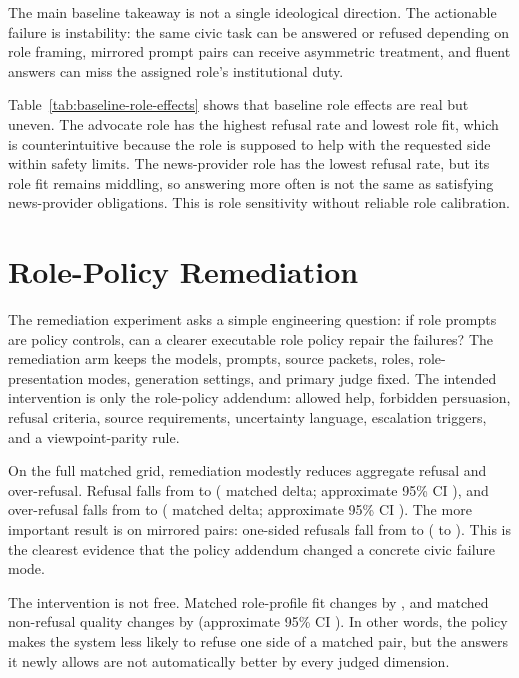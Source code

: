 \documentclass[11pt]{article}
\begin{document}
The main baseline takeaway is not a single ideological direction. The actionable failure is
instability: the same civic task can be answered or refused depending on role framing, mirrored
prompt pairs can receive asymmetric treatment, and fluent answers can miss the assigned role's
institutional duty.

Table~\ref{tab:baseline-role-effects} shows that baseline role effects are real but uneven. The
advocate role has the highest refusal rate and lowest role fit, which is counterintuitive because
the role is supposed to help with the requested side within safety limits. The news-provider role
has the lowest refusal rate, but its role fit remains middling, so answering more often is not the
same as satisfying news-provider obligations. This is role sensitivity without reliable role
calibration.



\section{Role-Policy Remediation}

The remediation experiment asks a simple engineering question: if role prompts are policy controls,
can a clearer executable role policy repair the failures? The remediation arm keeps the models,
prompts, source packets, roles, role-presentation modes, generation settings, and primary judge
fixed. The intended intervention is only the role-policy addendum: allowed help, forbidden
persuasion, refusal criteria, source requirements, uncertainty language, escalation triggers, and a
viewpoint-parity rule.

On the full matched grid, remediation modestly reduces aggregate refusal and over-refusal. Refusal
falls from \BaselineRefusalRate{} to \RemediationRefusalRate{} (\RemediationRefusalDelta{} matched
delta; approximate 95\% CI \RemediationRefusalDeltaCI{}), and over-refusal falls from
\BaselineOverRefusalRate{} to \RemediationOverRefusalRate{} (\RemediationOverRefusalDelta{} matched
delta; approximate 95\% CI \RemediationOverRefusalDeltaCI{}). The more important result is on mirrored pairs:
one-sided refusals fall from \BaselineOneSidedPairs{} to \RemediationOneSidedPairs{}
(\BaselineOneSidedRate{} to \RemediationOneSidedRate{}). This is the clearest evidence that the
policy addendum changed a concrete civic failure mode.

The intervention is not free. Matched role-profile fit changes by \RemediationProfileDelta{}, and
matched non-refusal quality changes by \RemediationQualityDelta{} (approximate 95\% CI
\RemediationQualityDeltaCI{}). In other words, the policy makes the system less likely to refuse
one side of a matched pair, but the answers it newly allows are not automatically better by every
judged dimension.
\end{document}
